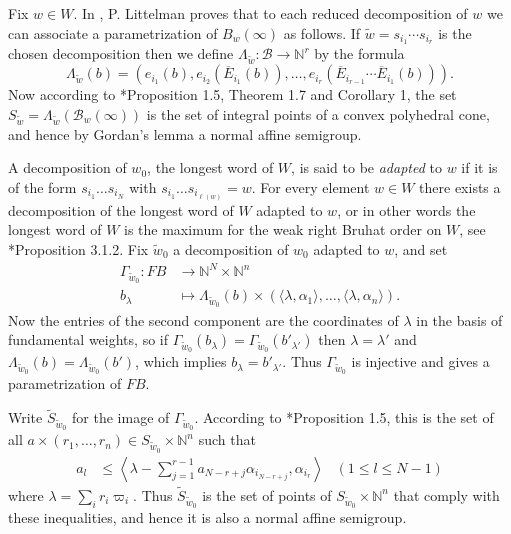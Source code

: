 \documentclass[11pt,fleqn]{article}
\newcommand\NN{\mathbb N}
\renewcommand\to{\longrightarrow}
\newcommand\B{\mathcal B}
\newcommand\flagbasis{FB}
\begin{document}
Fix $w \in W$. In \cite{Lit}, P. Littelman proves that to each reduced 
decomposition of $w$ we can associate a parametrization of $B_w(\infty)$ as 
follows. If $\tilde w = s_{i_1} \cdots s_{i_r}$ is the chosen decomposition 
then we define $\Lambda_{\tilde w}: \B \to \NN^r$ by the formula
\[
  \Lambda_{\tilde w}(b) 
    = (e_{i_1}(b), e_{i_{2}}(\overline E_{i_1}(b)), \ldots,
    e_{i_r}(\overline E_{i_{r-1}} \cdots \overline E_{i_1}(b))).
\]
Now according to \cite{Lit}*{Proposition 1.5, Theorem 1.7 and Corollary 1}, 
the set $S_{\tilde w} = \Lambda_{\tilde w}(\B_w(\infty))$ is the set of 
integral points of a convex polyhedral cone, and hence by Gordan's lemma a 
normal affine semigroup. 

A decomposition of $w_0$, the longest word of $W$, is said to be \emph{adapted}
to $w$ if it is of the form $s_{i_1} \ldots s_{i_N}$ with $s_{i_1} \ldots 
s_{i_{\ell(w)}} = w$. For every element $w \in W$ there exists a decomposition 
of the longest word of $W$ adapted to $w$, or in other words the longest word 
of $W$ is the maximum for the weak right Bruhat order on $W$, see 
\cite{BB}*{Proposition 3.1.2}. Fix $\tilde w_0$ a decomposition of $w_0$ 
adapted to $w$, and set
\begin{align*}
\Gamma_{\tilde w_0}:
   FB &\to \NN^{N} \times \NN^n \\
   b_\lambda & \longmapsto \Lambda_{\tilde w_0}(b) \times 
   (\langle \lambda, \alpha_1 \rangle, \ldots, \langle \lambda, \alpha_n 
   \rangle).
\end{align*}
Now the entries of the second component are the coordinates of $\lambda$ in 
the basis of fundamental weights, so if $\Gamma_{\tilde w_0}(b_\lambda) = 
\Gamma_{\tilde w_0}(b'_{\lambda'})$ then $\lambda = \lambda'$ and 
$\Lambda_{\tilde w_0}(b) = \Lambda_{\tilde w_0}(b')$, which implies 
$b_\lambda = b'_{\lambda'}$. Thus $\Gamma_{\tilde w_0}$ is injective and gives 
a parametrization of $\flagbasis$. 

Write $\tilde S_{\tilde w_0}$ for the image of $\Gamma_{\tilde w_0}$. 
According to \cite{Lit}*{Proposition 1.5}, this is the set of all 
$a \times (r_1, \ldots, r_n) \in S_{\tilde w_0} \times \NN^n$ such that
\begin{align*}
a_l 
  &\leq \left\langle \lambda - \sum_{j=1}^{r-1} a_{N-r+j} \alpha_{i_{N-r+j}}, 
  \alpha_{i_r} \right\rangle
& (1 \leq l \leq N-1)
\end{align*}
where $\lambda = \sum_i r_i \varpi_i$. Thus $\tilde S_{\tilde w_0}$ is the set 
of points of $S_{\tilde w_0} \times \NN^n$ that comply with these 
inequalities, and hence it is also a normal affine semigroup. 
\end{document}
